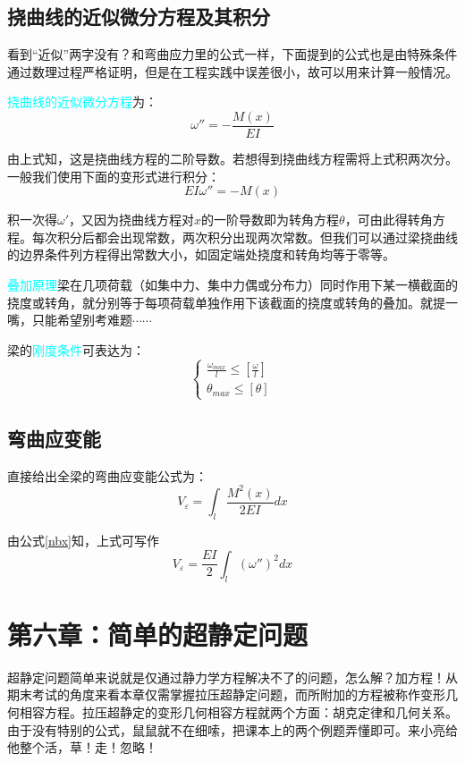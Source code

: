 \documentclass[10pt,a4paper]{ctexart}
\begin{document}
\subsection{挠曲线的近似微分方程及其积分}
看到“近似”两字没有？和弯曲应力里的公式一样，下面提到的公式也是由特殊条件通过数理过程严格证明，但是在工程实践中误差很小，故可以用来计算一般情况。

\textcolor{cyan}{挠曲线的近似微分方程}为：
\begin{equation}
\omega''=-\frac{M(x)}{EI}
\end{equation}

由上式知，这是挠曲线方程的二阶导数。若想得到挠曲线方程需将上式积两次分。一般我们使用下面的变形式进行积分：
\begin{equation}
EI\omega''=-M(x)
\label{nbx}
\end{equation}

积一次得$\omega'$，又因为挠曲线方程对$x$的一阶导数即为转角方程$\theta$，可由此得转角方程。每次积分后都会出现常数，两次积分出现两次常数。但我们可以通过梁挠曲线的边界条件列方程得出常数大小，如固定端处挠度和转角均等于零等。

\textcolor{cyan}{叠加原理}梁在几项荷载（如集中力、集中力偶或分布力）同时作用下某一横截面的挠度或转角，就分别等于每项荷载单独作用下该截面的挠度或转角的叠加。就提一嘴，只能希望别考难题$\cdots\cdots$

梁的\textcolor{cyan}{刚度条件}可表达为：
\begin{equation}
\begin{cases}
	\frac{\omega_{max}}{l}\leqslant\left[\frac{\omega}{l}\right]\\
	\theta_{max}\leqslant\left[\theta\right]
\end{cases}
\end{equation}

\subsection{弯曲应变能}
直接给出全梁的弯曲应变能公式为：
\begin{equation}
V_{\varepsilon}=\int_l \frac{M^2(x)}{2EI}dx
\end{equation}

由公式\ref{nbx}知，上式可写作
\begin{equation}
	V_{\varepsilon}=\frac{EI}{2}\int_l (\omega'')^2dx
\end{equation}

\newpage

\section{第六章：简单的超静定问题}
超静定问题简单来说就是仅通过静力学方程解决不了的问题，怎么解？加方程！从期末考试的角度来看本章仅需掌握拉压超静定问题，而所附加的方程被称作变形几何相容方程。拉压超静定的变形几何相容方程就两个方面：胡克定律和几何关系。由于没有特别的公式，鼠鼠就不在细嗦，把课本上的两个例题弄懂即可。来小亮给他整个活，草！走！忽略！
\end{document}
